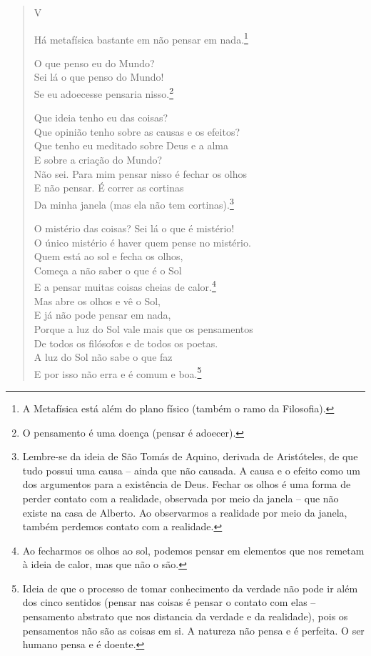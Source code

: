 \begin{verse}
V

Há metafísica bastante em não pensar em nada.\footnote{A Metafísica está além do plano físico (também o ramo da Filosofia).}

O que penso eu do Mundo? \\
Sei lá o que penso do Mundo! \\
Se eu adoecesse pensaria nisso.\footnote{O pensamento é uma doença (pensar é adoecer).}

Que ideia tenho eu das coisas? \\
Que opinião tenho sobre as causas e os efeitos? \\
Que tenho eu meditado sobre Deus e a alma \\
E sobre a criação do Mundo? \\
Não sei. Para mim pensar nisso é fechar os olhos \\
E não pensar. É correr as cortinas \\
Da minha janela (mas ela não tem cortinas).\footnote{Lembre-se da ideia de São Tomás de Aquino, derivada de Aristóteles, de que tudo possui uma causa -- ainda que não causada. A causa e o efeito como um dos argumentos para a existência de Deus. Fechar os olhos é uma forma de perder contato com a realidade, observada por meio da janela -- que não existe na casa de Alberto. Ao observarmos a realidade por meio da janela, também perdemos contato com a realidade.}

O mistério das coisas? Sei lá o que é mistério! \\
O único mistério é haver quem pense no mistério. \\
Quem está ao sol e fecha os olhos, \\
Começa a não saber o que é o Sol \\
E a pensar muitas coisas cheias de calor.\footnote{Ao fecharmos os olhos ao sol, podemos pensar em elementos que nos remetam à ideia de calor, mas que não o são.} \\
Mas abre os olhos e vê o Sol, \\
E já não pode pensar em nada, \\
Porque a luz do Sol vale mais que os pensamentos \\
De todos os filósofos e de todos os poetas. \\
A luz do Sol não sabe o que faz \\
E por isso não erra e é comum e boa.\footnote{Ideia de que o processo de tomar conhecimento da verdade não pode ir além dos cinco sentidos (pensar nas coisas é pensar o contato com elas -- pensamento abstrato que nos distancia da verdade e da realidade), pois os pensamentos não são as coisas em si. A natureza não pensa e é perfeita. O ser humano pensa e é doente.}


\end{verse}
